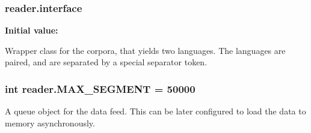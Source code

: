 \subsubsection[{\texorpdfstring{interface}{interface}}]{\setlength{\rightskip}{0pt plus 5cm}reader.\+interface}\hypertarget{namespacereader_a5660381a161b51169b78262c799b9e5e}{}\label{namespacereader_a5660381a161b51169b78262c799b9e5e}
{\bfseries Initial value\+:}
\begin{DoxyVerb}Wrapper class for the corpora, that yields two languages. The languages are paired, and
are separated by a special separator token.
\end{DoxyVerb}
\subsubsection[{\texorpdfstring{M\+A\+X\+\_\+\+S\+E\+G\+M\+E\+NT}{MAX_SEGMENT}}]{\setlength{\rightskip}{0pt plus 5cm}int reader.\+M\+A\+X\+\_\+\+S\+E\+G\+M\+E\+NT = 50000}\hypertarget{namespacereader_aa21cb0dad4e0cc8083f3bae694b15835}{}\label{namespacereader_aa21cb0dad4e0cc8083f3bae694b15835}
\begin{DoxyVerb}A queue object for the data feed. This can be later configured to load the data to
memory asynchronously.
\end{DoxyVerb}
 